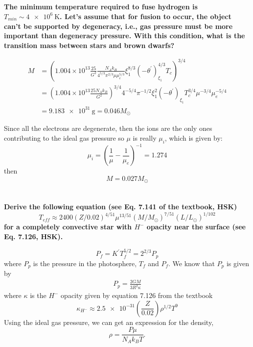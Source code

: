 \subsection{}
\textbf{The minimum temperature required to fuse hydrogen is $T_{min}\sim\SI{4e6}{\kelvin}$. 
Let's assume that for fusion to occur, the object can't be supported by degeneracy, i.e., gas pressure must be more important than degeneracy pressure. 
With this condition, what is the transition mass between stars and brown dwarfs?}

\begin{align*}
        M &= \left(1.004\times 10^{13} \frac{25}{G^2}\frac{N_Ak_B}{4^{5/3}\pi^{2/3} \mu\mu_e^{5/3}}\xi^{8/3}_1(-\theta^\prime)^{4/3}_{\xi_1}T_c\right)^{3/4} \\
        &= \left(1.004\times 10^{13} \frac{25 N_Ak_B}{G^2}\right)^{3/4}4^{-5/4}\pi^{-1/2}\xi_1^{2}(-\theta^\prime)_{\xi_1} T_c^{3/4}\mu^{-3/4}\mu_e^{-5/4}\\
        &= \SI{9.183e31}{\g} = 0.046 M_\odot
\end{align*}

Since all the electrons are degenerate, then the ions are the only ones contributing to the ideal gas pressure so $\mu$ is really $\mu_i$, which is given by:
\begin{equation}
    \mu_i = \left(\frac{1}{\mu}-\frac{1}{\mu_e}\right)^{-1} = 1.274
\end{equation}
then 
\begin{equation}
    M = 0.027 M_\odot
\end{equation}


\section{}
\textbf{Derive the following equation (see Eq. 7.141 of the textbook, HSK)
\begin{equation}
    T_{eff}\approx 2400(Z/0.02)^{4/51}\mu^{13/51}(M/M_\odot)^{7/51}(L/L_\odot)^{1/102}
\end{equation}
for a completely convective star with $H^{-}$ opacity near the surface (see Eq. 7.126, HSK).}

\begin{equation}
    P_f = K^\prime T_f^{5/2} = 2^{2/3}P_p
    \label{eq:Pf5}
\end{equation}
where $P_p$ is the pressure in the photosphere, $T_f$ and $P_f$.
We know that $P_p$ is given by 
\begin{align*}
    P_p = \frac{2GM}{3R^2\kappa}
\end{align*}
where $\kappa$ is the $H^-$ opacity given by equation 7.126 from the textbook
\begin{equation}
    \kappa_{H^-}\approx \num{2.5e-31}\left(\frac{Z}{0.02}\right)\rho^{1/2}T^9
    \label{eq:opacity5}
\end{equation}
Using the ideal gas pressure, we can get an expression for the density, 
\begin{equation}
    \rho = \frac{P\mu}{N_A k_B T}.
    \label{eq:density5}
\end{equation}

